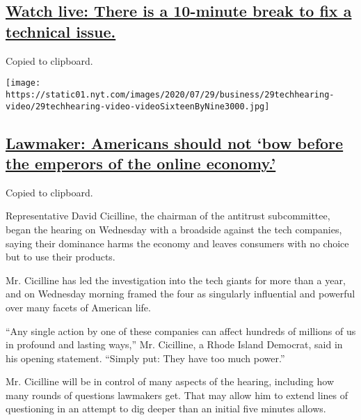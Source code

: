 \hypertarget{watch-live-there-is-a-10-minute-break-to-fix-a-technical-issue}{%
\subsection{\texorpdfstring{\protect\hyperlink{watch-live-there-is-a-10-minute-break-to-fix-a-technical-issue}{Watch
live: There is a 10-minute break to fix a technical
issue.}}{Watch live: There is a 10-minute break to fix a technical issue.}}\label{watch-live-there-is-a-10-minute-break-to-fix-a-technical-issue}}

Copied to clipboard.

\texttt{[image: https://static01.nyt.com/images/2020/07/29/business/29techhearing-video/29techhearing-video-videoSixteenByNine3000.jpg]}

\hypertarget{lawmaker-americans-should-not-bow-before-the-emperors-of-the-online-economy}{%
\subsection{\texorpdfstring{\protect\hyperlink{lawmaker-americans-should-not-bow-before-the-emperors-of-the-online-economy}{Lawmaker:
Americans should not `bow before the emperors of the online
economy.'}}{Lawmaker: Americans should not `bow before the emperors of the online economy.'}}\label{lawmaker-americans-should-not-bow-before-the-emperors-of-the-online-economy}}

Copied to clipboard.

Representative David Cicilline, the chairman of the antitrust
subcommittee, began the hearing on Wednesday with a broadside against
the tech companies, saying their dominance harms the economy and leaves
consumers with no choice but to use their products.

Mr. Cicilline has led the investigation into the tech giants for more
than a year, and on Wednesday morning framed the four as singularly
influential and powerful over many facets of American life.

``Any single action by one of these companies can affect hundreds of
millions of us in profound and lasting ways,'' Mr. Cicilline, a Rhode
Island Democrat, said in his opening statement. ``Simply put: They have
too much power.''

Mr. Cicilline will be in control of many aspects of the hearing,
including how many rounds of questions lawmakers get. That may allow him
to extend lines of questioning in an attempt to dig deeper than an
initial five minutes allows.

